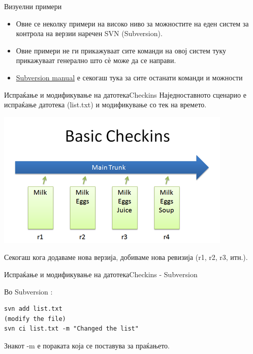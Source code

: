 \begin{frame}{Визуелни примери}
    \begin{itemize}
      \item Овие се неколку примери на високо ниво за можностите на еден систем
      за контрола на верзии наречен SVN (Subversion).
      \item Овие примери не ги прикажуваат сите команди на овој систем туку
      прикажуваат генерално што сѐ може да се направи.
      \item \href{http://svnbook.red-bean.com/}{Subversion manual} е секогаш
      тука за сите останати команди и можности
    \end{itemize}
\end{frame}

\begin{frame}{Испраќање и модификување на датотека}{Checkins}
Наједноставното сценарио е испраќање датотека (list.txt) и модификување со
тек на времето.
\begin{center}
    \includegraphics[scale=0.5]{images/basic_checkin.png}
\end{center}
Секогаш кога додаваме нова верзија, добиваме нова ревизија (r1, r2, r3, итн.).
\end{frame}

\begin{frame}[fragile]{Испраќање и модификување на датотека}{Checkins -
Subversion}
\begin{exampleblock}{Во Subversion :}
\begin{verbatim}
svn add list.txt
(modify the file)
svn ci list.txt -m "Changed the list"
\end{verbatim}
\end{exampleblock}
Знакот -m е пораката која се поставува за праќањето.
\end{frame}


